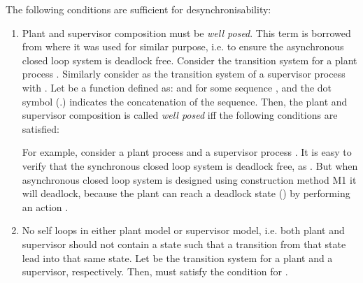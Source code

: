 \documentclass[a4paper,english,final]{article}
\theoremstyle{plain}
\theoremstyle{definition}
\begin{document}
The following conditions are sufficient for desynchronisability:
\begin{enumerate}
\item Plant and supervisor composition must be \textit{well posed}. This term is borrowed from \cite{balemiphdt} where it was used for similar purpose, i.e. to ensure the asynchronous closed loop system is deadlock free. Consider the transition system  for a plant process . Similarly consider  as the transition system of a supervisor process  with . Let  be a function defined as:  and  for some sequence , and the dot symbol (.) indicates the concatenation of the sequence. Then, the plant and supervisor composition is called \textit{well posed} iff the following conditions are satisfied:

For example, consider a plant process  and a supervisor process . It is easy to verify that the synchronous closed loop system is deadlock free, as . But when asynchronous closed loop system is designed using construction method M1 it will deadlock, because the plant can reach a deadlock state () by performing an action .
\item No self loops in either plant model or supervisor model, i.e. both plant and supervisor should not contain a state such that a transition from that state lead into that same state. Let  be the transition system for a plant and a supervisor, respectively. Then,  must satisfy the condition  for .


\end{enumerate}
\end{document}

